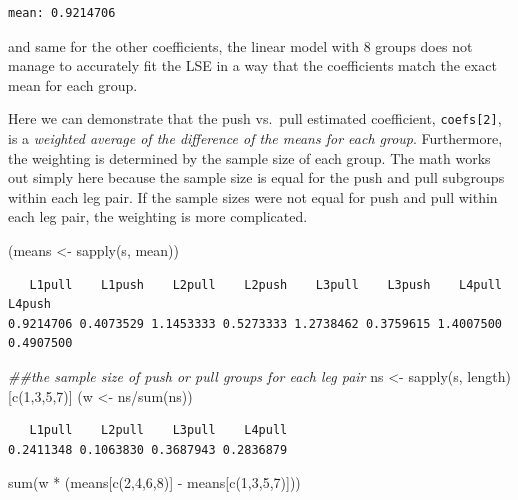 \documentclass[
  letterpaper,
  DIV=11,
  numbers=noendperiod]{scrartcl}
\newenvironment{Shaded}{\begin{snugshade}}{\end{snugshade}}
\newcommand{\DecValTok}[1]{\textcolor[rgb]{0.68,0.00,0.00}{#1}}
\newcommand{\DocumentationTok}[1]{\textcolor[rgb]{0.37,0.37,0.37}{\textit{#1}}}
\newcommand{\FunctionTok}[1]{\textcolor[rgb]{0.28,0.35,0.67}{#1}}
\newcommand{\NormalTok}[1]{\textcolor[rgb]{0.00,0.23,0.31}{#1}}
\newcommand{\OtherTok}[1]{\textcolor[rgb]{0.00,0.23,0.31}{#1}}
\newcommand{\SpecialCharTok}[1]{\textcolor[rgb]{0.37,0.37,0.37}{#1}}
\begin{document}
\begin{verbatim}
mean: 0.9214706
\end{verbatim}

and same for the other coefficients, the linear model with 8 groups does
not manage to accurately fit the LSE in a way that the coefficients
match the exact mean for each group.

Here we can demonstrate that the push vs.~pull estimated coefficient,
\texttt{coefs{[}2{]}}, is a \emph{weighted average of the difference of
the means for each group}. Furthermore, the weighting is determined by
the sample size of each group. The math works out simply here because
the sample size is equal for the push and pull subgroups within each leg
pair. If the sample sizes were not equal for push and pull within each
leg pair, the weighting is more complicated.

\begin{Shaded}
\begin{Highlighting}[]
\NormalTok{(means }\OtherTok{\textless{}{-}} \FunctionTok{sapply}\NormalTok{(s, mean))}
\end{Highlighting}
\end{Shaded}

\begin{verbatim}
   L1pull    L1push    L2pull    L2push    L3pull    L3push    L4pull    L4push 
0.9214706 0.4073529 1.1453333 0.5273333 1.2738462 0.3759615 1.4007500 0.4907500 
\end{verbatim}

\begin{Shaded}
\begin{Highlighting}[]
\DocumentationTok{\#\#the sample size of push or pull groups for each leg pair}
\NormalTok{ns }\OtherTok{\textless{}{-}} \FunctionTok{sapply}\NormalTok{(s, length)[}\FunctionTok{c}\NormalTok{(}\DecValTok{1}\NormalTok{,}\DecValTok{3}\NormalTok{,}\DecValTok{5}\NormalTok{,}\DecValTok{7}\NormalTok{)]}
\NormalTok{(w }\OtherTok{\textless{}{-}}\NormalTok{ ns}\SpecialCharTok{/}\FunctionTok{sum}\NormalTok{(ns))}
\end{Highlighting}
\end{Shaded}

\begin{verbatim}
   L1pull    L2pull    L3pull    L4pull 
0.2411348 0.1063830 0.3687943 0.2836879 
\end{verbatim}

\begin{Shaded}
\begin{Highlighting}[]
\FunctionTok{sum}\NormalTok{(w }\SpecialCharTok{*}\NormalTok{ (means[}\FunctionTok{c}\NormalTok{(}\DecValTok{2}\NormalTok{,}\DecValTok{4}\NormalTok{,}\DecValTok{6}\NormalTok{,}\DecValTok{8}\NormalTok{)] }\SpecialCharTok{{-}}\NormalTok{ means[}\FunctionTok{c}\NormalTok{(}\DecValTok{1}\NormalTok{,}\DecValTok{3}\NormalTok{,}\DecValTok{5}\NormalTok{,}\DecValTok{7}\NormalTok{)]))}
\end{Highlighting}
\end{Shaded}
\end{document}
